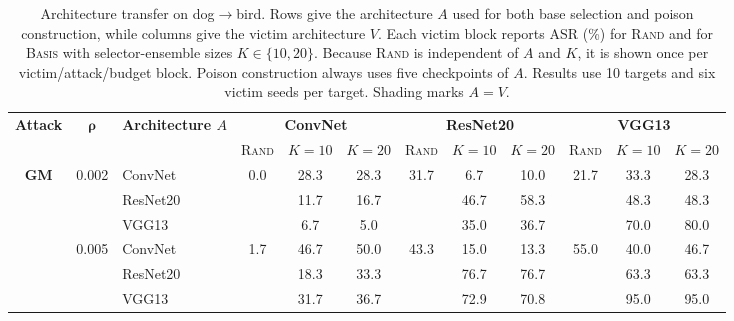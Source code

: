 \begin{table}[t]
\centering
\caption{Architecture transfer on dog$\rightarrow$bird. Rows give the
architecture $A$ used for both base selection and poison construction, while
columns give the victim architecture $V$. Each victim block reports ASR (\%)
for \textsc{Rand} and for \textsc{Basis} with selector-ensemble sizes
$K\in\{10,20\}$. Because \textsc{Rand} is independent of $A$ and $K$, it is
shown once per victim/attack/budget block. Poison construction always uses five
checkpoints of $A$. Results use 10 targets and six victim seeds per target.
Shading marks $A=V$.}
\label{tab:cross-architecture-k}
\begingroup
\fontsize{8}{9.5}\selectfont
\setlength{\tabcolsep}{3.0pt}
\renewcommand{\arraystretch}{1.08}
\setlength{\belowrulesep}{2pt}
\setlength{\aboverulesep}{2pt}

\newcommand{\matchcell}[1]{\cellcolor{black!7}#1}

\begin{tabular*}{\linewidth}{
  @{\hspace{1pt}\extracolsep{\fill}}
  ccl
  @{\hspace{5pt}}ccc
  @{\hspace{5pt}}ccc
  @{\hspace{5pt}}ccc
  @{\hspace{1pt}}
}
\toprule
\multirow{2}{*}{\textbf{Attack}} &
\multirow{2}{*}{$\boldsymbol{\rho}$} &
\multirow{2}{*}{\textbf{Architecture $A$}} &
\multicolumn{3}{c}{\textbf{ConvNet}} &
\multicolumn{3}{c}{\textbf{ResNet20}} &
\multicolumn{3}{c}{\textbf{VGG13}} \\
\cmidrule(lr){4-6}
\cmidrule(lr){7-9}
\cmidrule(l){10-12}
& & &
\textsc{Rand} & $K=10$ & $K=20$ &
\textsc{Rand} & $K=10$ & $K=20$ &
\textsc{Rand} & $K=10$ & $K=20$ \\
\midrule

\multirow{6}{*}{\textbf{GM}}
& \multirow{3}{*}{0.002} & ConvNet
& \multirow{3}{*}{0.0} & \matchcell{28.3} & \matchcell{28.3}
& \multirow{3}{*}{31.7} & 6.7 & 10.0
& \multirow{3}{*}{21.7} & 33.3 & 28.3 \\
& & ResNet20
& & 11.7 & 16.7
& & \matchcell{46.7} & \matchcell{58.3}
& & 48.3 & 48.3 \\
& & VGG13
& & 6.7 & 5.0
& & 35.0 & 36.7
& & \matchcell{70.0} & \matchcell{80.0} \\
\cmidrule(lr){2-12}
& \multirow{3}{*}{0.005} & ConvNet
& \multirow{3}{*}{1.7} & \matchcell{46.7} & \matchcell{50.0}
& \multirow{3}{*}{43.3} & 15.0 & 13.3
& \multirow{3}{*}{55.0} & 40.0 & 46.7 \\
& & ResNet20
& & 18.3 & 33.3
& & \matchcell{76.7} & \matchcell{76.7}
& & 63.3 & 63.3 \\
& & VGG13
& & 31.7 & 36.7
& & 72.9 & 70.8
& & \matchcell{95.0} & \matchcell{95.0} \\
\midrule


\end{tabular*}
\end{table}
